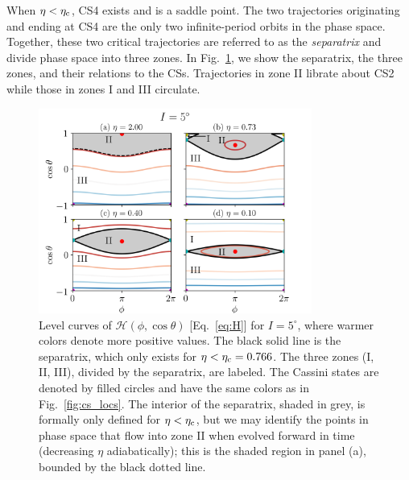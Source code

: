 \documentclass[twocolumn,twocolappendix]{aastex63}
\newcommand*{\p}[1]{\left(#1\right)}
\begin{document}
When $\eta < \eta_{\rm c}$, CS4 exists and is a saddle point. The two
trajectories originating and ending at CS4 are the only two infinite-period
orbits in the phase space. Together, these two critical trajectories are
referred to as the \emph{separatrix} and divide phase space into three zones. In
Fig.~\ref{fig:eq_1contours}, we show the separatrix, the three zones, and their
relations to the CSs. Trajectories in zone II librate about CS2 while those in
zones I and III circulate.
\begin{figure}
    \centering
    \includegraphics[width=0.8\textwidth]{plots_diskdisp/1contours_flip.png}
    \caption{Level curves of $\mathcal{H}\p{\phi, \cos \theta}$
    [Eq.~\eqref{eq:H}] for $I = 5^\circ$, where warmer colors denote more
    positive values. The black solid line is the separatrix, which only exists
    for $\eta < \eta_{\rm c} = 0.766$. The three zones (I, II, III), divided by
    the separatrix, are labeled. The Cassini states are denoted by filled
    circles and have the same colors as in Fig.~\ref{fig:cs_locs}. The interior
    of the separatrix, shaded in grey, is formally only defined for $\eta <
    \eta_{\rm c}$, but we may identify the points in phase space that flow into
    zone II when evolved forward in time (decreasing $\eta$ adiabatically); this
    is the shaded region in panel (a), bounded by the black dotted
    line.}\label{fig:eq_1contours}
\end{figure}
\end{document}
